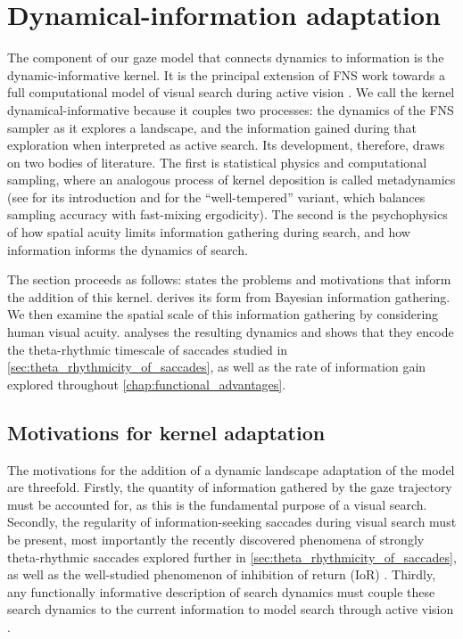 \section{Dynamical-information adaptation}\label{sec:dynamical-information_adaptation}
The component of our gaze model that connects dynamics to information is the dynamic-informative kernel. It is the principal extension of FNS work towards a full computational model of visual search during active vision \cite{qi_fractional_2022, chen_spatiotemporal_2022}. We call the kernel dynamical-informative because it couples two processes: the dynamics of the FNS sampler as it explores a landscape, and the information gained during that exploration when interpreted as active search. Its development, therefore, draws on two bodies of literature. The first is statistical physics and computational sampling, where an analogous process of kernel deposition is called metadynamics (see \textcite{barducci_well-tempered_2008} for its introduction and \textcite{bussi_using_2020} for the ``well-tempered'' variant, which balances sampling accuracy with fast-mixing ergodicity). The second is the psychophysics of how spatial acuity limits information gathering during search, and how information informs the dynamics of search.

The section proceeds as follows:  states the problems and motivations that inform the addition of this kernel.  derives its form from Bayesian information gathering. We then examine the spatial scale of this information gathering by considering human visual acuity.  analyses the resulting dynamics and shows that they encode the theta-rhythmic timescale of saccades studied in \cref{sec:theta_rhythmicity_of_saccades}, as well as the rate of information gain explored throughout \cref{chap:functional_advantages}. 
\subsection{Motivations for kernel adaptation}\label{subsec:motivations}
The motivations for the addition of a dynamic landscape adaptation of the model are threefold. Firstly, the quantity of information gathered by the gaze trajectory must be accounted for, as this is the fundamental purpose of a visual search. Secondly, the regularity of information-seeking saccades during visual search must be present, most importantly the recently discovered phenomena of strongly theta-rhythmic saccades explored further in \cref{sec:theta_rhythmicity_of_saccades}, as well as the well-studied phenomenon of inhibition of return (IoR) \cite{ludwig_mechanism_2009, redden_inhibition_2021}. Thirdly, any functionally informative description of search dynamics must couple these search dynamics to the current information to model search through active vision \cite{Renninger2005-ee, Bruce_2009_Saliency, mcdonnell_introductory_2011, kittler_effective_2026}. 

